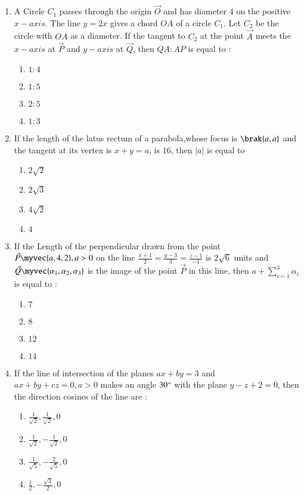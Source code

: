 \documentclass[journal]{IEEEtran}
\begin{document}
\begin{enumerate}
    
    \item A Circle $C_{1}$ passes through the origin $\vec{O}$ and has diameter $4$ on the positive $x-axis.$ The line $y=2x$ gives a chord $OA$ of a circle $C_{1}.$ Let $C_{2}$ be the circle with $OA$ as a diameter. If the tangent to $C_{2}$  at the point $\vec{A}$ meets the $x-axis$ at $\vec{P}$ and $y-axis$ at $\vec{Q}$, then $QA : AP$ is equal to :
    \begin{enumerate}
        \item $1:4$
        \item $1:5$
        \item $2:5$
        \item $1:3$
    \end{enumerate}


    \item If the length of the latus rectum of a parabola,whose focus is $\brak{a,a}$ and the tangent at its vertex is $x+y = a$, is $16$, then $|a|$ is equal to 
    \begin{enumerate}
        \item $2\sqrt{2}$
        \item $2\sqrt{3}$
        \item $4\sqrt{2}$
        \item $4$
    \end{enumerate}


    \item If the Length of the perpendicular drawn from the point $\vec{P} \myvec{a,4,2} , a > 0$ on the line $\frac{x+1}{2} = \frac{y-3}{3} = \frac{z-1}{-1}$ is $2\sqrt{6}$ units and $\vec{Q} \myvec{\alpha_{1},\alpha_{2},\alpha_{3}}$ is the image of the point $\vec{P}$ in this line, then $a + \sum_{i=1}^{3} \alpha_{i}$ is equal to :
    \begin{enumerate}
        \item $7$
        \item $8$
        \item $12$
        \item $14$
    \end{enumerate}

    \item If the line of intersection of the planes $ax+by=3$ and $ax+by+cz=0 , a>0$ makes an angle $30\degree$ with the plane $y-z+2=0$, then the direction cosines of the line are :
    \begin{enumerate}
        \item $\frac{1}{\sqrt{2}} , \frac{1}{\sqrt{2}}, 0$
        \item $\frac{1}{\sqrt{2}} , -\frac{1}{\sqrt{2}}, 0$
        \item $\frac{1}{\sqrt{5}} , -\frac{2}{\sqrt{5}}, 0$
        \item $\frac{1}{2} , -\frac{\sqrt{3}}{2}, 0$
    \end{enumerate}
  \end{enumerate}
\end{document}
